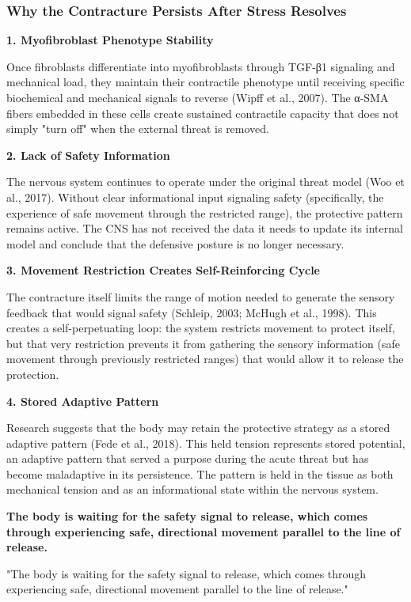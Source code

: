 \documentclass[11pt,letterpaper]{article}
\begin{document}
\subsubsection{Why the Contracture Persists After Stress Resolves}

\textbf{1. Myofibroblast Phenotype Stability}


Once fibroblasts differentiate into myofibroblasts through TGF-β1 signaling and mechanical load, they maintain their contractile phenotype until receiving specific biochemical and mechanical signals to reverse (Wipff et al., 2007). The α-SMA fibers embedded in these cells create sustained contractile capacity that does not simply "turn off" when the external threat is removed.


\textbf{2. Lack of Safety Information}

The nervous system continues to operate under the original threat model (Woo et al., 2017). Without clear informational input signaling safety (specifically, the experience of safe movement through the restricted range), the protective pattern remains active. The CNS has not received the data it needs to update its internal model and conclude that the defensive posture is no longer necessary.


\textbf{3. Movement Restriction Creates Self-Reinforcing Cycle}

The contracture itself limits the range of motion needed to generate the sensory feedback that would signal safety (Schleip, 2003; McHugh et al., 1998). This creates a self-perpetuating loop: the system restricts movement to protect itself, but that very restriction prevents it from gathering the sensory information (safe movement through previously restricted ranges) that would allow it to release the protection.


\textbf{4. Stored Adaptive Pattern}

Research suggests that the body may retain the protective strategy as a stored adaptive pattern (Fede et al., 2018). This held tension represents stored potential, an adaptive pattern that served a purpose during the acute threat but has become maladaptive in its persistence. The pattern is held in the tissue as both mechanical tension and as an informational state within the nervous system.


\textbf{The body is waiting for the safety signal to release, which comes through experiencing safe, directional movement parallel to the line of release.}


\begin{pullquotebox}
"The body is waiting for the safety signal to release, which comes through experiencing safe, directional movement parallel to the line of release."
\end{pullquotebox}
\end{document}
